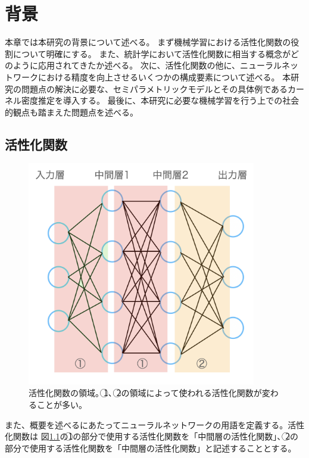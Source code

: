 \chapter{背景}
\label{background}

本章では本研究の背景について述べる。
まず機械学習における活性化関数の役割について明確にする。
また、統計学において活性化関数に相当する概念がどのように応用されてきたか述べる。
次に、活性化関数の他に、ニューラルネットワークにおける精度を向上させるいくつかの構成要素について述べる。
本研究の問題点の解決に必要な、セミパラメトリックモデルとその具体例であるカーネル密度推定を導入する。
最後に、本研究に必要な機械学習を行う上での社会的観点も踏まえた問題点を述べる。



\section{活性化関数}

\begin{figure}[hbtp]
    \begin{center}
        \includegraphics[width=10cm]{asset/neural_network2.png}
            \caption{活性化関数の領域。\textcircled{\scriptsize 1}、\textcircled{\scriptsize 2}の領域によって使われる活性化関数が変わることが多い。}
            \label{neural_network1}
    \end{center}
\end{figure}

また、概要を述べるにあたってニューラルネットワークの用語を定義する。活性化関数は
図\ref{neural_network1}の\textcircled{\scriptsize 1}の部分で使用する活性化関数を「中間層の活性化関数」、\textcircled{\scriptsize 2}の部分で使用する活性化関数を「中間層の活性化関数」と記述することとする。




